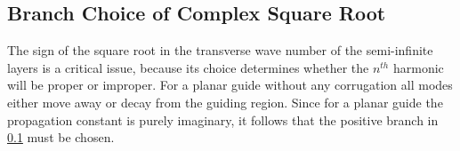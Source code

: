 \subsection{Branch Choice of Complex Square Root}
The sign of the square root in the transverse wave number of the
semi-infinite layers is a critical issue, because its choice
determines whether the $n^{th}$ harmonic will be proper or improper.
For a planar guide without any corrugation all modes either move away
or decay from the guiding region. Since for a planar guide the
propagation constant is purely imaginary, it follows that the positive
branch in \ref{} must be chosen.


